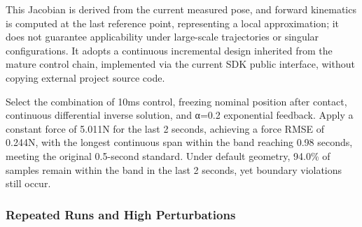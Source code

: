 This Jacobian is derived from the current measured pose, and forward kinematics is computed at the last reference point, representing a local approximation; it does not guarantee applicability under large-scale trajectories or singular configurations. It adopts a continuous incremental design inherited from the mature control chain, implemented via the current SDK public interface, without copying external project source code.


Select the combination of 10ms control, freezing nominal position after contact, continuous differential inverse solution, and α=0.2 exponential feedback. Apply a constant force of 5.011N for the last 2 seconds, achieving a force RMSE of 0.244N, with the longest continuous span within the band reaching 0.98 seconds, meeting the original 0.5-second standard. Under default geometry, 94.0\% of samples remain within the band in the last 2 seconds, yet boundary violations still occur.

\subsubsection{Repeated Runs and High Perturbations}\label{s12-detail-5}

